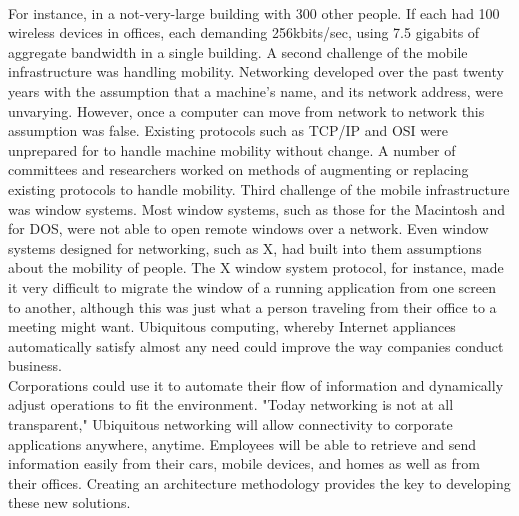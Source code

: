 \documentclass[12pt]{report}
\begin{document}
\\\hspace*{0.5in}For instance, in a not-very-large building with 300 other people. If each had 100 wireless devices in offices, each demanding 256kbits/sec, using 7.5 gigabits of aggregate bandwidth in a single building. A second challenge of the mobile infrastructure was handling mobility. Networking developed over the past twenty years with the assumption that a machine's name, and its network address, were unvarying. However, once a computer can move from network to network this assumption was false. Existing protocols such as TCP/IP and OSI were unprepared for to handle machine mobility without change. A number of committees and researchers worked on methods of augmenting or replacing existing protocols to handle mobility. Third challenge of the mobile infrastructure was window systems. Most window systems, such as those for the Macintosh and for DOS, were not able to open remote windows over a network. Even window systems designed for networking, such as X, had built into them assumptions about the mobility of people. The X window system protocol, for instance, made it very difficult to migrate the window of a running application from one screen to another, although this was just what a person traveling from their office to a meeting might want. 	 Ubiquitous computing, whereby Internet appliances automatically satisfy almost any need could improve the way companies conduct business.
\\\hspace*{0.5in}Corporations could use it to automate their flow of information and dynamically adjust operations to fit the environment. "Today networking is not at all transparent," Ubiquitous networking will allow connectivity to corporate applications anywhere, anytime. Employees will be able to retrieve and send information easily from their cars, mobile devices, and homes as well as from their offices. Creating an architecture methodology provides the key to developing these new solutions.
\end{document}
